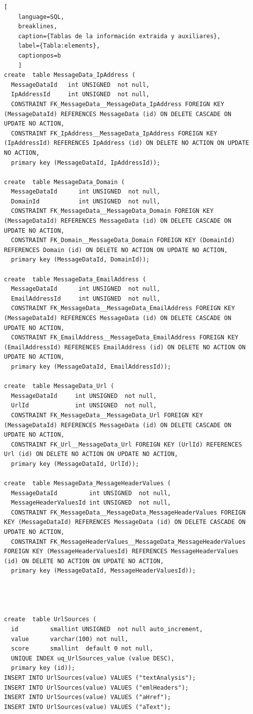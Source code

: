 \begin{lstlisting}[
    language=SQL,
    breaklines, 
    caption={Tablas de la información extraida y auxiliares}, 
    label={Tabla:elements}, 
    captionpos=b
    ]
create  table MessageData_IpAddress (
  MessageDataId   int UNSIGNED  not null, 
  IpAddressId     int UNSIGNED  not null,
  CONSTRAINT FK_MessageData__MessageData_IpAddress FOREIGN KEY (MessageDataId) REFERENCES MessageData (id) ON DELETE CASCADE ON UPDATE NO ACTION,
  CONSTRAINT FK_IpAddress__MessageData_IpAddress FOREIGN KEY (IpAddressId) REFERENCES IpAddress (id) ON DELETE NO ACTION ON UPDATE NO ACTION,
  primary key (MessageDataId, IpAddressId));

create  table MessageData_Domain (
  MessageDataId      int UNSIGNED  not null, 
  DomainId           int UNSIGNED  not null,
  CONSTRAINT FK_MessageData__MessageData_Domain FOREIGN KEY (MessageDataId) REFERENCES MessageData (id) ON DELETE CASCADE ON UPDATE NO ACTION,
  CONSTRAINT FK_Domain__MessageData_Domain FOREIGN KEY (DomainId) REFERENCES Domain (id) ON DELETE NO ACTION ON UPDATE NO ACTION,
  primary key (MessageDataId, DomainId));

create  table MessageData_EmailAddress (
  MessageDataId      int UNSIGNED  not null, 
  EmailAddressId     int UNSIGNED  not null,
  CONSTRAINT FK_MessageData__MessageData_EmailAddress FOREIGN KEY (MessageDataId) REFERENCES MessageData (id) ON DELETE CASCADE ON UPDATE NO ACTION,
  CONSTRAINT FK_EmailAddress__MessageData_EmailAddress FOREIGN KEY (EmailAddressId) REFERENCES EmailAddress (id) ON DELETE NO ACTION ON UPDATE NO ACTION,
  primary key (MessageDataId, EmailAddressId));

create  table MessageData_Url (
  MessageDataId     int UNSIGNED  not null, 
  UrlId             int UNSIGNED  not null,
  CONSTRAINT FK_MessageData__MessageData_Url FOREIGN KEY (MessageDataId) REFERENCES MessageData (id) ON DELETE CASCADE ON UPDATE NO ACTION,
  CONSTRAINT FK_Url__MessageData_Url FOREIGN KEY (UrlId) REFERENCES Url (id) ON DELETE NO ACTION ON UPDATE NO ACTION,
  primary key (MessageDataId, UrlId));

create  table MessageData_MessageHeaderValues (
  MessageDataId         int UNSIGNED  not null, 
  MessageHeaderValuesId int UNSIGNED  not null,
  CONSTRAINT FK_MessageData__MessageData_MessageHeaderValues FOREIGN KEY (MessageDataId) REFERENCES MessageData (id) ON DELETE CASCADE ON UPDATE NO ACTION,
  CONSTRAINT FK_MessageHeaderValues__MessageData_MessageHeaderValues FOREIGN KEY (MessageHeaderValuesId) REFERENCES MessageHeaderValues (id) ON DELETE NO ACTION ON UPDATE NO ACTION,
  primary key (MessageDataId, MessageHeaderValuesId));




create  table UrlSources (
  id         smallint UNSIGNED  not null auto_increment, 
  value      varchar(100) not null, 
  score      smallint  default 0 not null, 
  UNIQUE INDEX uq_UrlSources_value (value DESC),
  primary key (id));
INSERT INTO UrlSources(value) VALUES ("textAnalysis");
INSERT INTO UrlSources(value) VALUES ("emlHeaders");
INSERT INTO UrlSources(value) VALUES ("aHref");
INSERT INTO UrlSources(value) VALUES ("aText");


\end{lstlisting}
